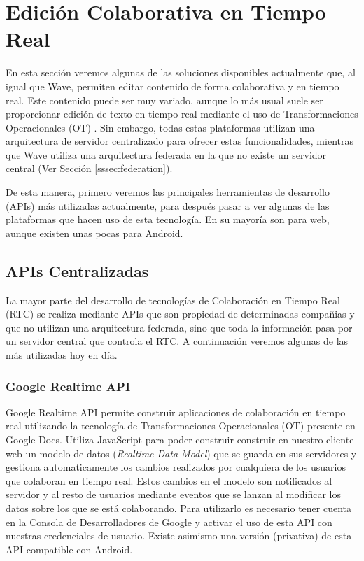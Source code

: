 \section{Edición Colaborativa en Tiempo Real}

En esta sección veremos algunas de las soluciones disponibles actualmente que, al igual que Wave, permiten editar contenido de forma colaborativa y en tiempo real. Este contenido puede ser muy variado, aunque lo más usual suele ser proporcionar edición de texto en tiempo real mediante el uso de Transformaciones Operacionales (OT) \cite{ref:how_ot_works}. Sin embargo, todas estas plataformas utilizan una arquitectura de servidor centralizado para ofrecer estas funcionalidades, mientras que Wave utiliza una arquitectura federada en la que no existe un servidor central (Ver Sección \ref{sssec:federation}).

De esta manera, primero veremos las principales herramientas de desarrollo (APIs) más utilizadas actualmente, para después pasar a ver algunas de las plataformas que hacen uso de esta tecnología. En su mayoría son para web, aunque existen unas pocas para Android. 
	
	\subsection{APIs Centralizadas}
	
	La mayor parte del desarrollo de tecnologías de Colaboración en Tiempo Real (RTC) se realiza mediante APIs que son propiedad de determinadas compañias y que no utilizan una arquitectura federada, sino que toda la información pasa por un servidor central que controla el RTC. A continuación veremos algunas de las más utilizadas hoy en día.
	
	\subsubsection{Google Realtime API}\label{sssec:googleAPI}
	
	Google Realtime API \cite{ref:google_api} permite construir aplicaciones de colaboración en tiempo real utilizando la tecnología de Transformaciones Operacionales (OT) presente en Google Docs. Utiliza JavaScript para poder construir construir en nuestro cliente web un modelo de datos (\textit{Realtime Data Model}) que se guarda en sus servidores y gestiona automaticamente los cambios realizados por cualquiera de los usuarios que colaboran en tiempo real. Estos cambios en el modelo son notificados al servidor y al resto de usuarios mediante eventos que se lanzan al modificar los datos sobre los que se está colaborando. Para utilizarlo es necesario tener cuenta en la Consola de Desarrolladores de Google y activar el uso de esta API con nuestras credenciales de usuario. Existe asimismo una versión (privativa) de esta API compatible con Android.
	
